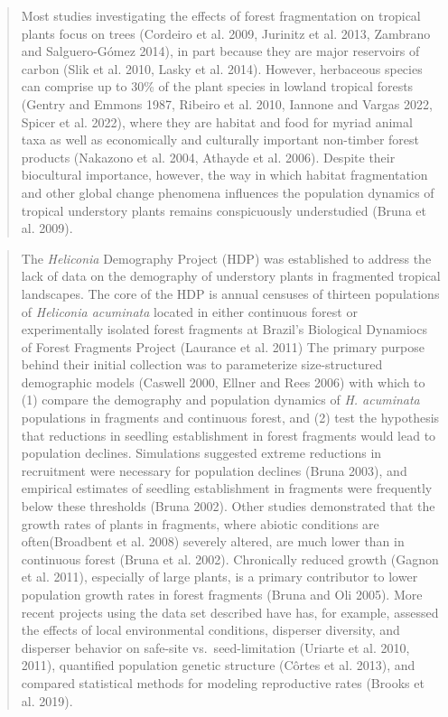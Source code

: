 \documentclass[
  man, donotrepeattitle,floatsintext]{apa6}
\begin{document}
\begin{quote}
Most studies investigating the effects of forest fragmentation on tropical plants focus on trees (Cordeiro et al. 2009, Jurinitz et al. 2013, Zambrano and Salguero-Gómez 2014), in part because they are major reservoirs of carbon (Slik et al. 2010, Lasky et al. 2014). However, herbaceous species can comprise up to 30\% of the plant species in lowland tropical forests (Gentry and Emmons 1987, Ribeiro et al. 2010, Iannone and Vargas 2022, Spicer et al. 2022), where they are habitat and food for myriad animal taxa as well as economically and culturally important non-timber forest products (Nakazono et al. 2004, Athayde et al. 2006). Despite their biocultural importance, however, the way in which habitat fragmentation and other global change phenomena influences the population dynamics of tropical understory plants remains conspicuously understudied (Bruna et al. 2009).
\end{quote}

\begin{quote}
The \emph{Heliconia} Demography Project (HDP) was established to address the lack of data on the demography of understory plants in fragmented tropical landscapes. The core of the HDP is annual censuses of thirteen populations of \emph{Heliconia acuminata} located in either continuous forest or experimentally isolated forest fragments at Brazil's Biological Dynamiocs of Forest Fragments Project (Laurance et al. 2011) The primary purpose behind their initial collection was to parameterize size-structured demographic models (Caswell 2000, Ellner and Rees 2006) with which to (1) compare the demography and population dynamics of \emph{H. acuminata} populations in fragments and continuous forest, and (2) test the hypothesis that reductions in seedling establishment in forest fragments would lead to population declines. Simulations suggested extreme reductions in recruitment were necessary for population declines (Bruna 2003), and empirical estimates of seedling establishment in fragments were frequently below these thresholds (Bruna 2002). Other studies demonstrated that the growth rates of plants in fragments, where abiotic conditions are often(Broadbent et al. 2008) severely altered, are much lower than in continuous forest (Bruna et al. 2002). Chronically reduced growth (Gagnon et al. 2011), especially of large plants, is a primary contributor to lower population growth rates in forest fragments (Bruna and Oli 2005). More recent projects using the data set described have has, for example, assessed the effects of local environmental conditions, disperser diversity, and disperser behavior on safe-site vs.~seed-limitation (Uriarte et al. 2010, 2011), quantified population genetic structure (Côrtes et al. 2013), and compared statistical methods for modeling reproductive rates (Brooks et al. 2019).
\end{quote}
\end{document}

